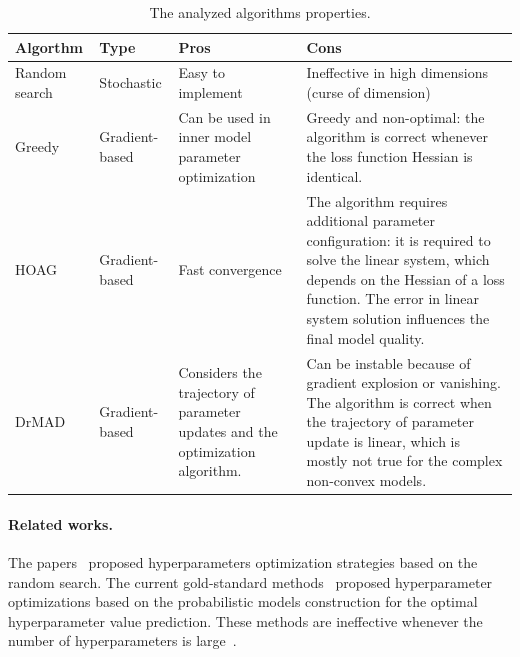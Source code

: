 \documentclass[smallcondensed]{svjour3}
\begin{document}
\begin{table}
\footnotesize

\begin{tabularx}{\textwidth}{|p{2cm}|p{2cm}|X|X|}
\hline
\bf Algorthm & \bf Type  & \bf Pros & \bf Cons  \\ \hline
Random search & Stochastic & Easy to implement & Ineffective in high dimensions (curse of dimension)\\ \hline
Greedy~\cite{hyper_greed} & Gradient-based & Can be used in inner model parameter optimization& Greedy and non-optimal: the algorithm is correct whenever the loss function Hessian is identical. \\ \hline
HOAG~\cite{hyper_hoag} & Gradient-based & Fast convergence & The algorithm requires additional parameter configuration: it is required to solve the linear system, which depends on the Hessian of a loss function. The error in linear system solution influences the final model quality.\\ \hline 
DrMAD~\cite{hyper_mad} & Gradient-based & Considers the trajectory of parameter updates and the optimization algorithm.& Can be instable because of gradient explosion or vanishing. The algorithm is correct when the trajectory of parameter update is linear, which is mostly not true for the complex non-convex models. \\ \hline
\end{tabularx}

\caption{The analyzed algorithms properties.}
\label{table:algo_descr}

\end{table}


\paragraph{Related works.}
The papers~\cite{random1,random2} proposed hyperparameters optimization strategies based on the random search. The current gold-standard methods~\cite{probopt1,probopt2}  proposed hyperparameter optimizations based on the probabilistic models construction for the optimal hyperparameter value prediction. These methods are  ineffective whenever the number of hyperparameters is large~\cite{hyper}.
\end{document}
